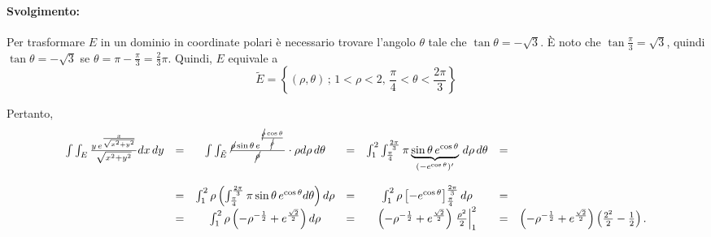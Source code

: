 \begin{example}
	\paragraph{Svolgimento:} Per trasformare $E$ in un dominio in coordinate polari è necessario trovare l'angolo $\theta$ tale che $\tan\theta=-\sqrt{3}$. È noto che $\tan\frac{\pi}{3}=\sqrt{3}$, quindi $\tan\theta = -\sqrt{3}$ se $\theta=\pi - \frac{\pi}{3} = \frac{2}{3}\pi$. Quindi, $E$ equivale a
	\begin{equation*}
		\tilde{E} = \left\{(\rho, \theta)\,;\, 1 < \rho < 2,\, \frac{\pi}{4} < \theta < \frac{2\pi}{3}\right\}
	\end{equation*}
	
	Pertanto,
	\begin{equation*}
		\begin{matrix}
				\int\int_E \frac{y\, e^{\frac{x}{\sqrt{x^2 + y^2}}}}{\sqrt{x^2+y^2}} dx\, dy &=& \int\int_{\tilde{E}} \frac{\cancel{\rho} \sin\theta\, e^{\frac{\cancel{\rho}\cos\theta}{\cancel{\rho}}}}{\cancel{\rho}}\cdot\rho d\rho\, d\theta &=& \int_1^2\int_{\frac{\pi}{4}}^{\frac{2\pi}{3}} \pi \underbrace{\sin\theta\, e^{\cos\theta}}_{(-e^{\cos\theta})'} \, d\rho\, d\theta  &=&\\\\
				&=& \int_1^2 \rho\left(\int_{\frac{\pi}{4}}^{\frac{2\pi}{3}} \pi \sin\theta\, e^{\cos\theta}d\theta\right)d\rho &=& \int_1^2\rho\left[-e^{\cos\theta}\right]_{\frac{\pi}{4}}^{\frac{2\pi}{3}} d\rho &=&\\
				&=& \int_1^2 \rho \left(-\rho ^{-\frac{1}{2}} + e^{\frac{\sqrt{2}}{2}}\right) d\rho &=& \left(-\rho ^{-\frac{1}{2}} + e^{\frac{\sqrt{2}}{2}}\right)\left.\frac{\rho^2}{2}\right\rvert_{1}^{2} &=& \left(-\rho ^{-\frac{1}{2}} + e^{\frac{\sqrt{2}}{2}}\right)\left(\frac{2^2}{2}-\frac{1}{2}\right).
		\end{matrix}
	\end{equation*}
\end{example}

